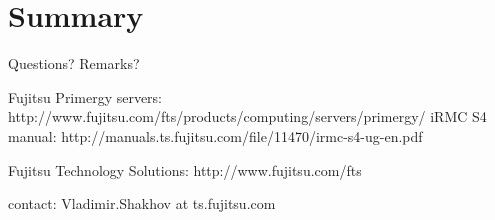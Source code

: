 \documentclass{beamer}
\begin{document}
\section*{Summary}
\begin{frame}{Questions? Remarks?}
  
  \begin{center}
  \end{center}

  \normalsize{Fujitsu Primergy servers: http://www.fujitsu.com/fts/products/computing/servers/primergy/ }
  \normalsize{iRMC S4 manual: http://manuals.ts.fujitsu.com/file/11470/irmc-s4-ug-en.pdf}
  
  \normalsize{Fujitsu Technology Solutions: http://www.fujitsu.com/fts}

  contact: Vladimir.Shakhov at ts.fujitsu.com


\end{frame}
\end{document}
